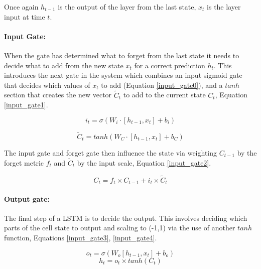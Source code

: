\documentclass[11pt,twoside]{report}
\begin{document}
Once again $h_{t-1}$ is the output of the layer from the last state, $x_{t}$ is the layer input at time $t$.

\paragraph{Input Gate:} When the gate has determined what to forget from the last state it needs to decide what to add from the new state $x_{t}$ for a correct prediction $h_{t}$. This introduces the next gate in the system which combines an input sigmoid gate that decides which values of $x_{t}$ to add (Equation \ref{input_gate0}), and a $tanh$ section that creates the new vector $\tilde{C}_{t}$ to add to the current state $C_{t}$, Equation \ref{input_gate1}.



\begin{equation}
\mathit{i}_{t} = \sigma (W_{i} \cdot [h_{t-1},x_{t}] + b_{i})
\label{input_gate0}
\end{equation}

\begin{equation}
\tilde{C}_{t} = tanh(W_{C} \cdot [h_{t-1},x_{t}] + b_{C})
\label{input_gate1}
\end{equation}



The input gate and forget gate then influence the state via weighting $C_{t-1}$ by the forget metric $f_{t}$ and $\tilde{C}_{t}$ by the input scale, Equation \ref{input_gate2}.

\begin{equation}
C_{t} = f_{t} \times C_{t-1} + i_{t} \times \tilde{C}_{t}
\label{input_gate2}
\end{equation}

\paragraph{Output gate:} The final step of a LSTM is to decide the output. This involves deciding which parts of the cell state to output and scaling to (-1,1) via the use of another $tanh$ function, Equations \ref{input_gate3}, \ref{input_gate4}.


\begin{equation}
o_{t} = \sigma (W_{o}[h_{t-1},x_{t}] + b_{o})
\label{input_gate3}
\end{equation}
\begin{equation}
h_{t} = o_{t} \times tanh(C_{t})
\label{input_gate4}
\end{equation}
\end{document}
